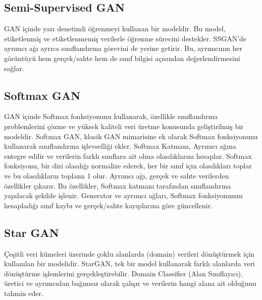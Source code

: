 \subsection{Semi-Supervised GAN}

GAN içinde yarı denetimli öğrenmeyi kullanan bir modeldir. Bu model, etiketlenmiş ve etiketlenmemiş verilerle öğrenme sürecini destekler. SSGAN'de ayrımcı ağı ayrıca sınıflandırma görevini de yerine getirir. Bu, ayrımcının her görüntüyü hem gerçek/sahte hem de sınıf bilgisi açısından değerlendirmesini sağlar.

\subsection{Softmax GAN}

GAN içinde Softmax fonksiyonunu kullanarak, özellikle sınıflandırma problemlerini çözme ve yüksek kaliteli veri üretme konusunda geliştirilmiş bir modeldir. Softmax GAN, klasik GAN mimarisine ek olarak Softmax fonksiyonunu kullanarak sınıflandırma işlevselliği ekler. Softmax Katmanı, Ayrımcı ağına entegre edilir ve verilerin farklı sınıflara ait olma olasılıklarını hesaplar. Softmax fonksiyonu, bir dizi olasılığı normalize ederek, her bir sınıf için olasılıkları toplar ve bu olasılıkların toplamı 1 olur. Ayrımcı ağı, gerçek ve sahte verilerden özellikler çıkarır. Bu özellikler, Softmax katmanı tarafından sınıflandırma yapılacak şekilde işlenir. Generator ve ayrımcı ağları, Softmax fonksiyonunun hesapladığı sınıf kaybı ve gerçek/sahte kayıplarına göre güncellenir.

\subsection{Star GAN}

Çeşitli veri kümeleri üzerinde çoklu alanlarda (domain) verileri dönüştürmek için kullanılan bir modelidir. StarGAN, tek bir model kullanarak farklı alanlarda veri dönüştürme işlemlerini gerçekleştirebilir. Domain Classifier (Alan Sınıflayıcı), üretici ve ayrımcıdan bağımsız olarak çalışır ve verilerin hangi alana ait olduğunu tahmin eder. 

\newpage